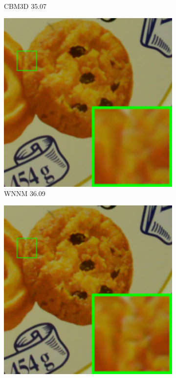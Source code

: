 \begin{figure}
\begin{subfigure}[t]{0.19\textwidth}
		\caption{CBM3D 35.07}
    \end{subfigure}
    \hfill
    \begin{subfigure}[t]{0.19\textwidth}
        \centering
        \includegraphics[width=1\textwidth]{images/guided/cc15/resize_br_WNNM_d600_iso3200_2_real.png}
\caption{WNNM 36.09}
    \end{subfigure}
    \hfill
    \begin{subfigure}[t]{0.19\textwidth}
        \centering
        \includegraphics[width=1\textwidth]{images/guided/cc15/resize_br_TRD_d600_iso3200_2_real.png}

\end{subfigure}
\end{figure}
